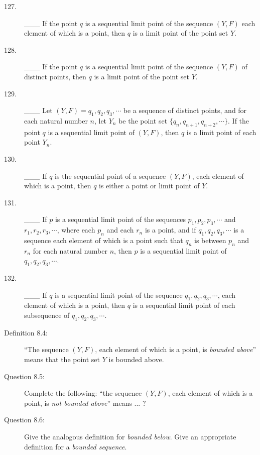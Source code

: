 \documentclass{book}
\begin{document}
\begin{description}
\item[127.] \_\_\_ If the point $q$ is a sequential limit point of the sequence $(Y,F)$ each element of which is a point, then $q$ is a limit point of the point set $Y$.

\item[128.] \_\_\_ If the point $q$ is a sequential limit point of the sequence $(Y,F)$ of distinct points, then $q$ is a limit point of the point set $Y$.

\item[129.] \_\_\_ Let $(Y,F) = q_{1}, q_{2}, q_{3}, \cdots$ be a sequence of distinct points, and for each natural number $n$, let $Y_{n}$ be the point set $\{ q_{n}, q_{n+1}, q_{n+2}, \cdots \}$. If the point $q$ is a sequential limit point of $(Y,F)$, then $q$ is a limit point of each point $Y_{n}$.

\item[130.] \_\_\_ If $q$ is the sequential point of a sequence $(Y,F)$, each element of which is a point, then $q$ is either a point or limit point of $Y$.

\item[131.] \_\_\_ If $p$ is a sequential limit point of the sequences $p_{1}, p_{2}, p_{3}, \cdots$ and $\ \ \ \ \ $ $r_{1}, r_{2}, r_{3}, \cdots$, where each $p_{n}$ and each $r_{n}$ is a point, and if $q_{1}, q_{2}, q_{3}, \cdots$ is a sequence each element of which is a point such that $q_{n}$ is between $p_{n}$ and $r_{n}$ for each natural number $n$, then $p$ is a sequential limit point of $q_{1}, q_{2}, q_{3}, \cdots$.

\item[132.] \_\_\_ If $q$ is a sequential limit point of the sequence $q_{1}, q_{2}, q_{3}, \cdots$, each element of which is a point, then $q$ is a sequential limit point of each subsequence of $q_{1}, q_{2}, q_{3}, \cdots$.

\item[Definition 8.4:] ``The sequence $(Y,F)$, each element of which is a point, is \emph{bounded above}'' means that the point set $Y$ is bounded above.

\item[Question 8.5:] Complete the following: ``the sequence $(Y,F)$, each element of which is a point, is \emph{not bounded above}'' means ... ?

\item[Question 8.6:] Give the analogous definition for \emph{bounded below}. Give an appropriate definition for a \emph{bounded sequence}.


\end{description}
\end{document}
